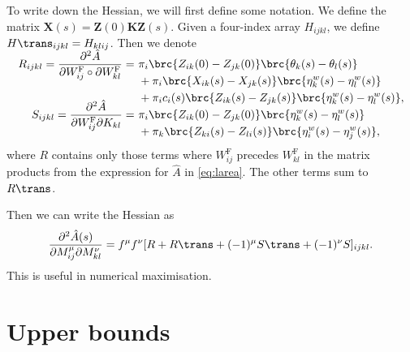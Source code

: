 \documentclass[12pt]{article}
\newcommand{\eqm}{\pi}
\newcommand{\fundm}{Z}
\newcommand{\fund}{\mathbf{\fundm}}
\newcommand{\etwm}{\eta^w}
\newcommand{\thbm}{\theta}
\newcommand{\Wm}{W}
\newcommand{\MMdm}{M}
\newcommand{\encm}{K}
\newcommand{\enc}{\mathbf{\encm}}
\newcommand{\frgm}{\Wm^{\mathrm{F}}}
\renewcommand{\pdiff}[2]{\frac{\partial #1}{\partial #2}}
\begin{document}
To write down the Hessian, we will first define some notation.
We define the matrix \(\mathbf{X}(s) = \fund(0) \enc \fund(s)\).
Given a four-index array \(H_{ijkl}\), we define \(H\trans_{ijkl} = H_{klij}\).
Then we denote
%
\begin{equation}\label{eq:hessparts}
\begin{alignedat}{3}
    R_{ijkl} = \smash{\pdiff{^2 \hat{A}}{\frgm_{ij} \circ \partial \frgm_{kl}}} 
    &= \
    &&\eqm_i \brc{\fundm_{ik}(0) - \fundm_{jk}(0)} \brc{\thbm_k(s) - \thbm_l(s)} \\
    &&&+ \eqm_i \brc{{X}_{ik}(s) - {X}_{jk}(s)} 
          \brc{\etwm_k(s) - \etwm_l(s)} \\
    &&&+ \eqm_i {c}_i(s) \brc{\fundm_{ik}(s) - \fundm_{jk}(s)} 
          \brc{\etwm_k(s) - \etwm_l(s)},  \\
  S_{ijkl} = \smash{\pdiff{^2 \hat{A}}{\frgm_{ij} \partial \encm_{kl}} }
  &= \
    &&\eqm_i \brc{\fundm_{ik}(0) - \fundm_{jk}(0)} \brc{\etwm_k(s) - \etwm_l(s)} \\
    &&&+ \eqm_k \brc{\fundm_{ki}(s) - \fundm_{li}(s)} \brc{\etwm_i(s) - \etwm_j(s)},
\end{alignedat}
\end{equation}
%
where \(R\) contains only those terms where \( \frgm_{ij} \) precedes \( \frgm_{kl} \) in the matrix products from the expression for \( \hat{A} \) in \cref{eq:larea}.
The other terms sum to \(R\trans\).

Then we can write the Hessian as
%
\begin{equation}\label{eq:hessian}
  \pdiff{^2\hat{A}(s)}{\MMdm^\mu_{ij} \partial \MMdm^\nu_{kl}} =
     f^\mu f^\nu [R + R\trans + (-1)^\mu S\trans + (-1)^\nu S]_{ijkl}.
\end{equation}
%
This is useful in numerical maximisation.


\section{Upper bounds}\label{sec:upperbnds}
\end{document}
